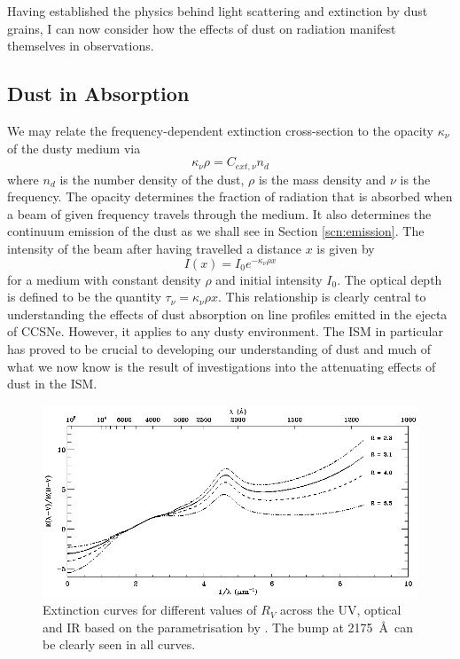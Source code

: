 Having established the physics behind light scattering and extinction by dust grains, I can now consider how the effects of dust on radiation manifest themselves in observations. 



\subsection{Dust in Absorption}
\label{scn:abs}
 

We may relate the frequency-dependent extinction cross-section to the opacity $\kappa_{\nu}$ of the dusty medium via
\begin{equation}
\kappa_{\nu} \rho = C_{ext,\nu} n_d
\end{equation}
\noindent where $n_d$ is the number density of the dust, $\rho$ is the mass density and $\nu$ is the frequency.  The opacity determines the fraction of radiation that is absorbed when a beam of given frequency travels through the medium.  It also determines the continuum emission of the dust as we shall see in Section \ref{scn:emission}.  The intensity of the beam after having travelled a distance $x$ is given by
\begin{equation}
I(x)=I_0 e^{-\kappa_{\nu} \rho x}
\end{equation}
\noindent  for a medium with constant density $\rho$ and initial intensity $I_0$.  The optical depth  is defined to be the quantity $\tau_{\nu}=\kappa_{\nu} \rho x$.  This relationship is clearly central to understanding the effects of dust absorption on line profiles emitted in the ejecta of CCSNe.  However, it applies to any dusty environment.  The ISM in particular has proved to be crucial to developing our understanding of dust and much of what we now know is the result of investigations into the attenuating effects of dust in the ISM.  
 
 \begin{figure}
\centering
\includegraphics[clip=true,scale=0.53,trim= 0 0 0 0]{chapters/chapter1/figs/extinction_curves2.png}
\caption{Extinction curves for different values of $R_V$ across the UV, optical and IR based on the parametrisation by \citet{Cardelli1989}.  The bump at 2175~\AA\ can be clearly seen in all curves.}
\label{fig:ext_curve}
\end{figure}
 
